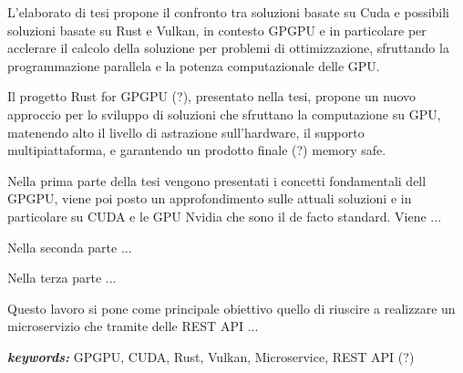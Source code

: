
L'elaborato di tesi propone il confronto tra soluzioni basate su Cuda e possibili soluzioni basate su Rust e Vulkan, in contesto GPGPU e in particolare per acclerare il calcolo della soluzione per problemi di ottimizzazione, sfruttando la programmazione parallela e la potenza computazionale delle GPU.

Il progetto Rust for GPGPU (?), presentato nella tesi, propone un nuovo approccio per lo sviluppo di soluzioni che sfruttano la computazione su GPU, matenendo alto il livello di astrazione sull'hardware, il supporto multipiattaforma, e garantendo un prodotto finale (?) memory safe.

Nella prima parte della tesi vengono presentati i concetti fondamentali dell GPGPU, viene poi posto un approfondimento sulle attuali soluzioni e in particolare su CUDA e le GPU Nvidia che sono il de facto standard. Viene ...

Nella seconda parte ...

Nella terza parte ...


Questo lavoro si pone come principale obiettivo quello di riuscire a realizzare un microservizio che tramite delle REST API ... 

\bigskip

\textit{\textbf{keywords:}} GPGPU, CUDA, Rust, Vulkan, Microservice, REST API (?)